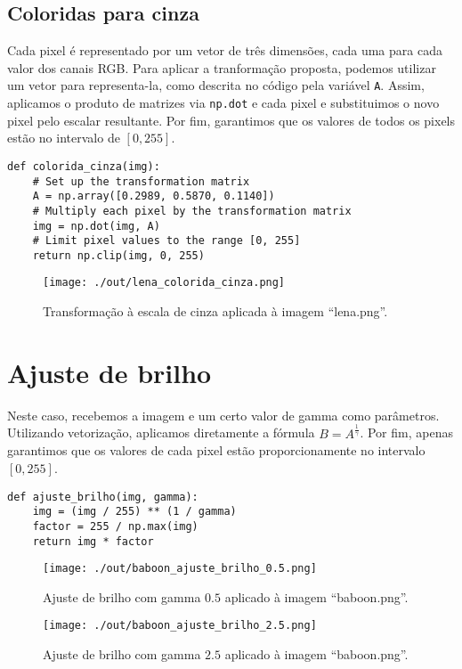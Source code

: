 \documentclass[11pt]{article}
\begin{document}
\subsection*{Coloridas para cinza}
\label{sec:org6397fd9}
Cada pixel é representado por um vetor de três dimensões, cada uma para cada valor dos canais RGB.
Para aplicar a tranformação proposta, podemos utilizar um vetor para representa-la, como descrita no código pela variável \texttt{A}.
Assim, aplicamos o produto de matrizes via \texttt{np.dot} e cada pixel e substituimos o novo pixel pelo escalar resultante.
Por fim, garantimos que os valores de todos os pixels estão no intervalo de \([0, 255]\).
\begin{verbatim}
def colorida_cinza(img):
    # Set up the transformation matrix
    A = np.array([0.2989, 0.5870, 0.1140])
    # Multiply each pixel by the transformation matrix
    img = np.dot(img, A)
    # Limit pixel values to the range [0, 255]
    return np.clip(img, 0, 255)
\end{verbatim}
\begin{figure}[H]
\centering
\texttt{[image: ./out/lena\_colorida\_cinza.png]}
\caption{Transformação à escala de cinza aplicada à imagem ``lena.png''.}
\end{figure}

\section*{Ajuste de brilho}
\label{sec:org4b2c3a5}
Neste caso, recebemos a imagem e um certo valor de gamma como parâmetros.
Utilizando vetorização, aplicamos diretamente a fórmula \(B = A^{\frac{1}{\gamma}}\).
Por fim, apenas garantimos que os valores de cada pixel estão proporcionamente no intervalo \([0,255]\).
\begin{verbatim}
def ajuste_brilho(img, gamma):
    img = (img / 255) ** (1 / gamma)
    factor = 255 / np.max(img)
    return img * factor
\end{verbatim}
\begin{figure}[H]
\centering
\texttt{[image: ./out/baboon\_ajuste\_brilho\_0.5.png]}
\caption{Ajuste de brilho com gamma \(0.5\) aplicado à imagem ``baboon.png''.}
\end{figure}
\begin{figure}[H]
\centering
\texttt{[image: ./out/baboon\_ajuste\_brilho\_2.5.png]}
\caption{Ajuste de brilho com gamma \(2.5\) aplicado à imagem ``baboon.png''.}
\end{figure}
\end{document}
